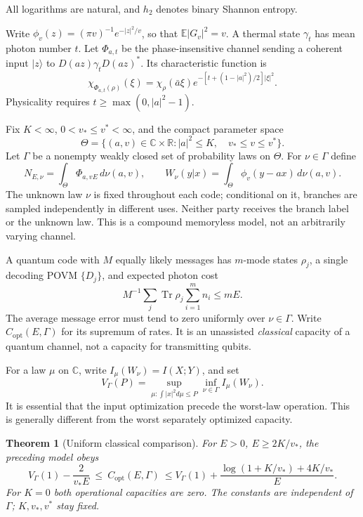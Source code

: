 \documentclass[11pt]{article}
\newtheorem{theorem}{Theorem}
\newcommand{\C}{\mathbb C}
\newcommand{\E}{\mathbb E}
\newcommand{\Tr}{\operatorname{Tr}}
\newcommand{\capq}{C_{\mathrm{opt}}}
\begin{document}
All logarithms are natural, and \(h_2\) denotes binary Shannon entropy.

Write
\(\phi_v(z)=(\pi v)^{-1}e^{-|z|^2/v}\), so that
\(\E|G_v|^2=v\). A thermal state \(\gamma_t\) has mean photon
number \(t\). Let \(\Phi_{a,t}\) be the phase-insensitive channel
sending a coherent input \(|z\rangle\) to
\(D(az)\gamma_tD(az)^*\). Its characteristic function is
\[
 \chi_{\Phi_{a,t}(\rho)}(\xi)=
 \chi_\rho(\bar a\xi)
 e^{-[t+(1-|a|^2)/2]|\xi|^2}.
\]
Physicality requires \(t\geq \max(0,|a|^2-1)\).

Fix \(K<\infty\), \(0<v_*\leq v^*<\infty\), and the compact parameter
space
\[
 \Theta=\{(a,v)\in\C\times\mathbb R: |a|^2\leq K,\quad
                                    v_*\leq v\leq v^*\}.
\]
Let \(\Gamma\) be a nonempty weakly closed set of probability laws on
\(\Theta\). For \(\nu\in\Gamma\) define
\[
 N_{E,\nu}=\int_\Theta\Phi_{a,vE}\,d\nu(a,v),\qquad
 W_\nu(y|x)=\int_\Theta\phi_v(y-ax)\,d\nu(a,v).
\]
The unknown law \(\nu\) is fixed throughout each code; conditional on it,
branches are sampled independently in different uses. Neither party
receives the branch label or the unknown law. This is a compound
memoryless model, not an arbitrarily varying channel.

A quantum code with \(M\) equally likely messages has \(m\)-mode states
\(\rho_j\), a single decoding POVM \(\{D_j\}\), and expected photon cost
\[
 M^{-1}\sum_j\Tr\rho_j\sum_{i=1}^m n_i\leq mE .
\]
The average message error must tend to zero uniformly over \(\nu\in\Gamma\).
Write \(\capq(E,\Gamma)\) for its supremum of rates. It is an
unassisted \emph{classical} capacity of a quantum channel, not a
capacity for transmitting qubits.

For a law \(\mu\) on \(\C\), write \(I_\mu(W_\nu)=I(X;Y)\), and set
\[
 V_\Gamma(P)=
 \sup_{\mu:\int|x|^2d\mu\leq P}\inf_{\nu\in\Gamma} I_\mu(W_\nu).
\]
It is essential that the input optimization precede the worst-law
operation. This is generally different from the worst separately
optimized capacity.

\begin{theorem}[Uniform classical comparison]\label{thm:main}
For \(E>0\), \(E\geq 2K/v_*\), the preceding model obeys
\[
 V_\Gamma(1)-\frac{2}{v_*E}
 \ \leq\ \capq(E,\Gamma)\
 \leq V_\Gamma(1)+
 \frac{\log(1+K/v_*)+4K/v_*}{E}.                 \tag{1}
\]
For \(K=0\) both operational capacities are zero.
The constants are independent of \(\Gamma\); \(K,v_*,v^*\) stay fixed.
\end{theorem}
\end{document}
